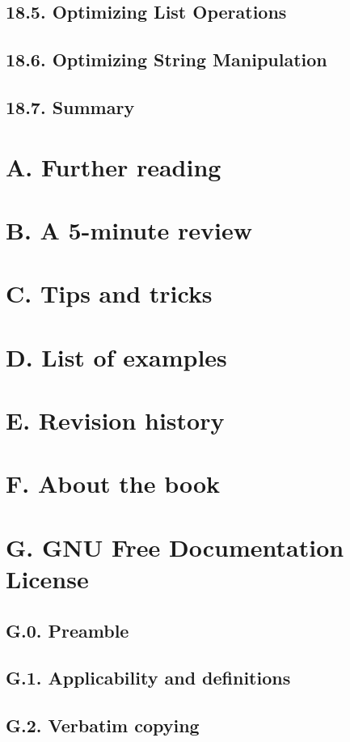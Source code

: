 \documentclass[oneside,12pt]{book}
\begin{document}
\section{18.5. Optimizing List Operations}
\section{18.6. Optimizing String Manipulation}
\section{18.7. Summary}
      
\appendix
   
\chapter{A. Further reading}
\chapter{B. A 5-minute review}
\chapter{C. Tips and tricks}
\chapter{D. List of examples}
\chapter{E. Revision history}
\chapter{F. About the book}
\chapter{G. GNU Free Documentation License}
\setcounter{section}{-1}
\section{G.0. Preamble}
\section{G.1. Applicability and definitions}
\section{G.2. Verbatim copying}
\end{document}
